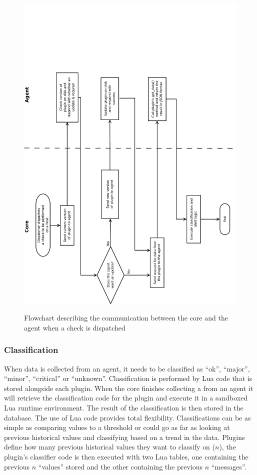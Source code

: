 \documentclass[bsc,logo,twoside,parskip,singlespacing,notimes]{infthesis}
\begin{document}
\begin{figure}[H]
	\caption{Flowchart describing the communication between the core and the agent
		when a check is dispatched}
	\includegraphics[scale=0.6, angle=-90]{assets/core_agent_communication.pdf}
	\label{core_agent_communication}
\end{figure}

\subsubsection{Classification}
\label{core-classification}

	When data is collected from an agent, it needs to be classified as ``ok'',
	``major'', ``minor'', ``critical'' or ``unknown''.  Classification is performed by Lua
	code that is stored alongside each plugin.  When the core finishes collecting a
	from an agent it will retrieve the classification code for the plugin and
	execute it in a sandboxed Lua runtime environment.  The result of the
	classification is then stored in the database.  The use of Lua code provides
	total flexibility. Classifications can be as simple as comparing values to a
	threshold or could go as far as looking at previous historical values and
	classifying based on a trend in the data. Plugins define how many previous
	historical values they want to classify on ($n$), the plugin's classifier code
	is then executed with two Lua tables, one containing the previous $n$ ``values''
	stored and the other containing the previous $n$ ``messages''.
\end{document}
